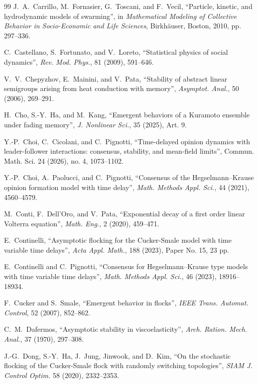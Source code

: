 \documentclass[11pt]{amsart}
\numberwithin{equation}{section}
\begin{document}
\begin{thebibliography}{99}
J.~A.~Carrillo, M.~Fornasier, G.~Toscani, and F.~Vecil, ``Particle, kinetic, and hydrodynamic models of swarming'', in \textit{Mathematical Modeling of Collective Behavior in Socio-Economic and Life Sciences}, Birkh\"auser, Boston, 2010, pp. 297--336.

C.~Castellano, S.~Fortunato, and V.~Loreto, ``Statistical physics of social dynamics'', \textit{Rev. Mod. Phys.}, 81 (2009), 591--646.

V.~V.~Chepyzhov, E.~Mainini, and V.~Pata, ``Stability of abstract linear semigroups arising from heat conduction with memory'', \textit{Asymptot. Anal.}, 50 (2006), 269--291.

H.~Cho, S.-Y.~Ha, and M.~Kang, ``Emergent behaviors of a Kuramoto ensemble under fading memory'', \textit{J. Nonlinear Sci.}, 35 (2025), Art. 9.

Y.-P.~Choi, C.~Cicolani, and C.~Pignotti,
``Time-delayed opinion dynamics with leader-follower interactions: consensus, stability, and mean-field limits'',
Commun. Math. Sci. 24 (2026), no. 4, 1073--1102.

Y.-P.~Choi, A.~Paolucci, and C.~Pignotti, ``Consensus of the Hegselmann--Krause opinion formation model with time delay'', \textit{Math. Methods Appl. Sci.}, 44 (2021), 4560--4579.

M.~Conti, F.~Dell'Oro, and V.~Pata, ``Exponential decay of a first order linear Volterra equation'', \textit{Math. Eng.}, 2 (2020), 459--471.

E.~Continelli,
``Asymptotic flocking for the Cucker-Smale model with time variable time delays'',
\textit{Acta Appl. Math.}, 188 (2023), Paper No. 15, 23 pp.

E.~Continelli and C.~Pignotti, ``Consensus for Hegselmann--Krause type models with time variable time delays'', \textit{Math. Methods Appl. Sci.}, 46 (2023), 18916--18934.

F.~Cucker and S.~Smale, ``Emergent behavior in flocks'', \textit{IEEE Trans. Automat. Control}, 52 (2007), 852--862.

C.~M.~Dafermos, ``Asymptotic stability in viscoelasticity'', \textit{Arch. Ration. Mech. Anal.}, 37 (1970), 297--308.

J.-G.~Dong, S.-Y.~Ha, J.~Jung, Jinwook, and D.~Kim,
 ``On the stochastic flocking of the Cucker-Smale flock with randomly switching topologies'',
\textit{SIAM J. Control Optim.} 58 (2020), 2332--2353.


\end{thebibliography}
\end{document}
